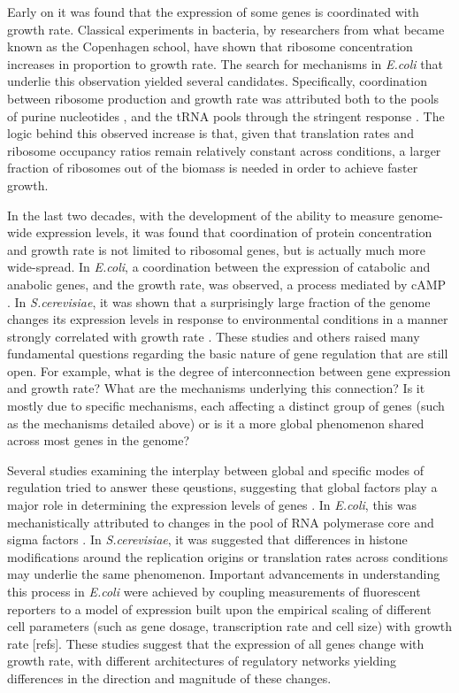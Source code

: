 \documentclass[notitlepage]{article}
\begin{document}
Early on it was found that the expression of some genes is coordinated with growth rate.
Classical experiments in bacteria, by researchers from what became known as the Copenhagen school, have shown that ribosome concentration increases in proportion to growth rate\parencite{Schaechter1958}.
The search for mechanisms in \emph{E.coli} that underlie this observation yielded several candidates.
Specifically, coordination between ribosome production and growth rate was attributed both to the pools of purine nucleotides \parencite{Gourse1996,Gaal1997}, and the tRNA pools through the stringent response \parencite{Chatterji2001,Brauer2008a}.
The logic behind this observed increase is that, given that translation rates and ribosome occupancy ratios remain relatively constant across conditions, a larger fraction of ribosomes out of the biomass is needed in order to achieve faster growth.

In the last two decades, with the development of the ability to measure genome-wide expression levels, it was found that coordination of protein concentration and growth rate is not limited to ribosomal genes, but is actually much more wide-spread.
In \emph{E.coli}, a coordination between the expression of catabolic and anabolic genes, and the growth rate, was observed, a process mediated by cAMP \parencite{Saldanha2004}.
In \emph{S.cerevisiae}, it was shown that a surprisingly large fraction of the genome changes its expression levels in response to environmental conditions in a manner strongly correlated with growth rate \parencite{Keren2013a,Gasch2000,Castrillo2007, Zaslaver2009a, Berthoumieux2013, Gerosa2013}.
These studies and others raised many fundamental questions regarding the basic nature of gene regulation that are still open.
For example, what is the degree of interconnection between gene expression and growth rate? What are the mechanisms underlying this connection? Is it mostly due to specific mechanisms, each affecting a distinct group of genes (such as the mechanisms detailed above) or is it a more global phenomenon shared across most genes in the genome?

Several studies examining the interplay between global and specific modes of regulation tried to answer these qeustions, suggesting that global factors play a major role in determining the expression levels of genes \parencite{Gasch2000, Klumpp2009a,Scott2010}.
In \emph{E.coli}, this was mechanistically attributed to changes in the pool of RNA polymerase core and sigma factors \parencite{Klumpp2008}.
In \emph{S.cerevisiae}, it was suggested that differences in histone modifications around the replication origins \parencite{regenberg2006} or translation rates \parencite{Gasch2000} across conditions may underlie the same phenomenon.
Important advancements in understanding this process in \emph{E.coli} were achieved by coupling measurements of fluorescent reporters to a model of expression built upon the empirical scaling of different cell parameters (such as gene dosage, transcription rate and cell size) with growth rate [refs].
These studies suggest that the expression of all genes change with growth rate, with different architectures of regulatory networks yielding differences in the direction and magnitude of these changes. 
\end{document}

